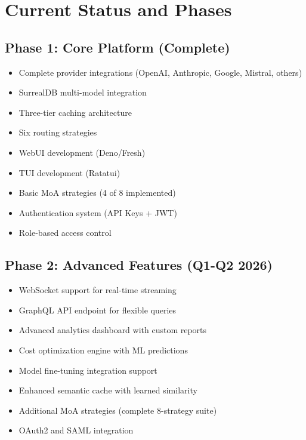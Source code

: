 \documentclass[12pt,a4paper,twoside]{report}
\newcommand{\cmark}{\ding{51}}
\begin{document}
\section{Current Status and Phases}

\subsection{Phase 1: Core Platform (Complete)}

\begin{itemize}[leftmargin=*]
    \item[\cmark] Complete provider integrations (OpenAI, Anthropic, Google, Mistral, others)
    \item[\cmark] SurrealDB multi-model integration
    \item[\cmark] Three-tier caching architecture
    \item[\cmark] Six routing strategies
    \item[\cmark] WebUI development (Deno/Fresh)
    \item[\cmark] TUI development (Ratatui)
    \item[\cmark] Basic MoA strategies (4 of 8 implemented)
    \item[\cmark] Authentication system (API Keys + JWT)
    \item[\cmark] Role-based access control
\end{itemize}

\subsection{Phase 2: Advanced Features (Q1-Q2 2026)}

\begin{itemize}[leftmargin=*]
    \item WebSocket support for real-time streaming
    \item GraphQL API endpoint for flexible queries
    \item Advanced analytics dashboard with custom reports
    \item Cost optimization engine with ML predictions
    \item Model fine-tuning integration support
    \item Enhanced semantic cache with learned similarity
    \item Additional MoA strategies (complete 8-strategy suite)
    \item OAuth2 and SAML integration
\end{itemize}
\end{document}
